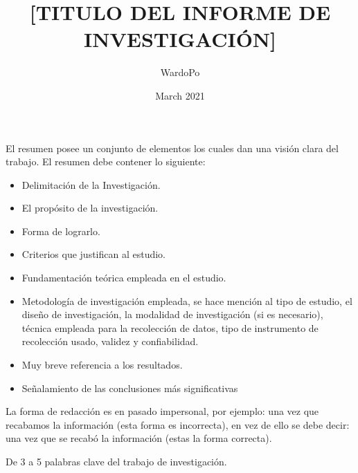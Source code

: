 \documentclass[12]{informe_investigacion}
\title{[TITULO DEL  INFORME DE INVESTIGACIÓN]}
\author{WardoPo}
\date{March 2021}
\begin{document}


\tableofcontents

\begin{resumen}
El resumen posee un conjunto de elementos los cuales dan una visión clara del trabajo. El resumen debe contener lo siguiente:\\

\begin{itemize}
    \item Delimitación de la Investigación.
    \item El propósito de la investigación. 
    \item Forma de lograrlo. 
    \item Criterios que justifican al estudio.
    \item Fundamentación teórica empleada en el estudio. 
    \item Metodología de investigación empleada, se hace mención al tipo de estudio, el diseño de investigación, la modalidad de investigación (si es necesario),  técnica empleada para la recolección de datos, tipo de instrumento de recolección usado, validez y confiabilidad.
    \item Muy breve referencia a los resultados. 
    \item Señalamiento de las conclusiones más significativas 
\end{itemize}

La forma de redacción es en pasado impersonal, por ejemplo: una vez que recabamos la información (esta forma es incorrecta), en vez de ello se debe decir: una vez que se recabó la información (estas la forma correcta). 
\end{resumen}

\begin{abstract}
    
\end{abstract}

\begin{palabras_clave}
De 3 a 5 palabras clave del trabajo de investigación. 
\end{palabras_clave}




\end{document}
